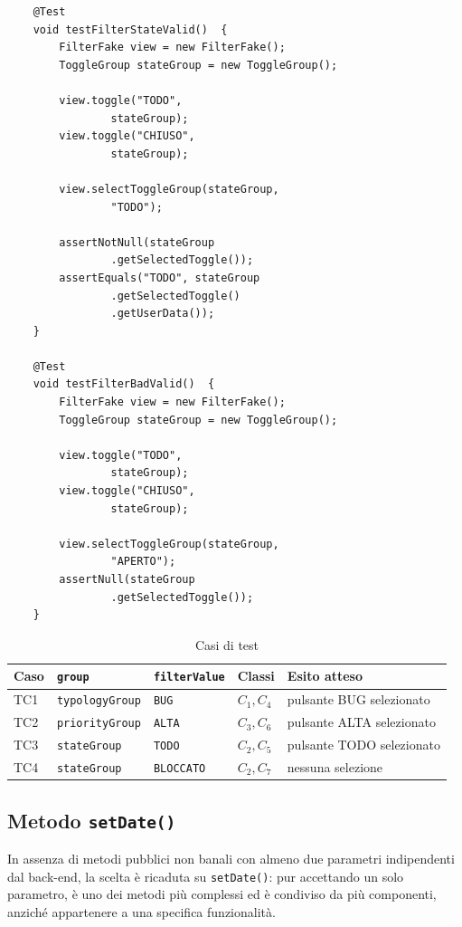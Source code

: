\clearpage

\begin{listing}[!ht]
\begin{verbatim}
    @Test
    void testFilterStateValid()  {
        FilterFake view = new FilterFake();
        ToggleGroup stateGroup = new ToggleGroup();

        view.toggle("TODO",
                stateGroup);
        view.toggle("CHIUSO",
                stateGroup);

        view.selectToggleGroup(stateGroup,
                "TODO");

        assertNotNull(stateGroup
                .getSelectedToggle());
        assertEquals("TODO", stateGroup
                .getSelectedToggle()
                .getUserData());
    }

    @Test
    void testFilterBadValid()  {
        FilterFake view = new FilterFake();
        ToggleGroup stateGroup = new ToggleGroup();

        view.toggle("TODO",
                stateGroup);
        view.toggle("CHIUSO",
                stateGroup);

        view.selectToggleGroup(stateGroup,
                "APERTO");
        assertNull(stateGroup
                .getSelectedToggle());
    }
\end{verbatim}
\end{listing}

\begin{table}[ht]
  \centering
  \small
  \caption{Casi di test}
  \label{tab:test-selecttogglefilter}
  \begin{tabular}{@{}llllp{4cm}@{}}
    \toprule
    Caso & \texttt{group} & \texttt{filterValue} & Classi & Esito atteso \\
    \midrule
    TC1 & \texttt{typologyGroup} & \texttt{BUG}  & $C_1, C_4$ & pulsante BUG selezionato  \\
    TC2 & \texttt{priorityGroup} & \texttt{ALTA} & $C_3, C_6$ & pulsante ALTA selezionato \\
    TC3 & \texttt{stateGroup}    & \texttt{TODO} & $C_2, C_5$ & pulsante TODO selezionato \\
    TC4 & \texttt{stateGroup} & \texttt{BLOCCATO}  & $C_2, C_7$ & nessuna selezione         \\
    \bottomrule
  \end{tabular}
\end{table}

\newpage

\subsection{Metodo \texttt{setDate()}}
In assenza di metodi pubblici non banali con almeno due 
parametri indipendenti dal back-end, la scelta è ricaduta su \texttt{setDate()}: 
pur accettando un solo parametro, è uno dei metodi più complessi ed 
è condiviso da più componenti, anziché appartenere a una specifica funzionalità.

